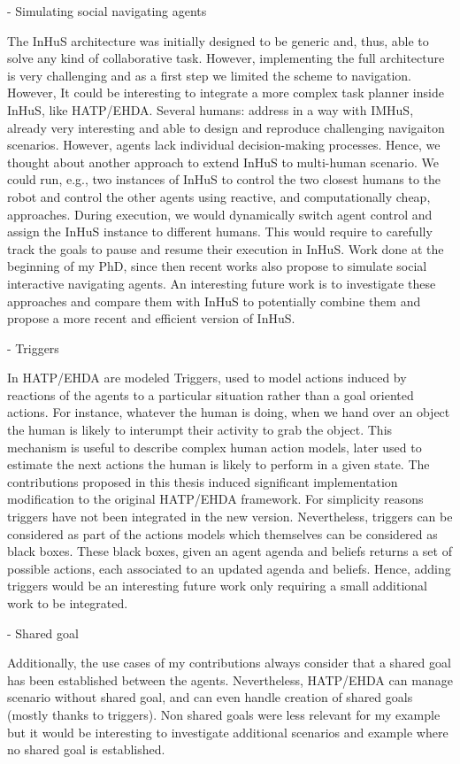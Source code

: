 - Simulating social navigating agents

The InHuS architecture was initially designed to be generic and, thus, able to solve any kind of collaborative task. However, implementing the full architecture is very challenging and as a first step we limited the scheme to navigation. However, It could be interesting to integrate a more complex task planner inside InHuS, like HATP/EHDA.  
Several humans: address in a way with IMHuS, already very interesting and able to design and reproduce challenging navigaiton scenarios. However, agents lack individual decision-making processes. Hence, we thought about another approach to extend InHuS to multi-human scenario. We could run, e.g., two instances of InHuS to control the two closest humans to the robot and control the other agents using reactive, and computationally cheap, approaches. During execution, we would dynamically switch agent control and assign the InHuS instance to different humans. This would require to carefully track the goals to pause and resume their execution in InHuS. 
Work done at the beginning of my PhD, since then recent works also propose to simulate social interactive navigating agents. An interesting future work is to investigate these approaches and compare them with InHuS to potentially combine them and propose a more recent and efficient version of InHuS.   


- Triggers

In HATP/EHDA are modeled Triggers, used to model actions induced by reactions of the agents to a particular situation rather than a goal oriented actions. For instance, whatever the human is doing, when we hand over an object the human is likely to interumpt their activity to grab the object. This mechanism is useful to describe complex human action models, later used to estimate the next actions the human is likely to perform in a given state. 
The contributions proposed in this thesis induced significant implementation modification to the original HATP/EHDA framework. For simplicity reasons triggers have not been integrated in the new version. Nevertheless, triggers can be considered as part of the actions models which themselves can be considered as black boxes. These black boxes, given an agent agenda and beliefs returns a set of possible actions, each associated to an updated agenda and beliefs. Hence, adding triggers would be an interesting future work only requiring a small additional work to be integrated.

- Shared goal 

Additionally, the use cases of my contributions always consider that a shared goal has been established between the agents. Nevertheless, HATP/EHDA can manage scenario without shared goal, and can even handle creation of shared goals (mostly thanks to triggers). Non shared goals were less relevant for my example but it would be interesting to investigate additional scenarios and example where no shared goal is established.